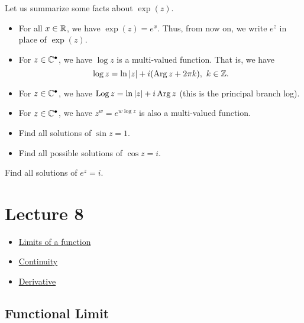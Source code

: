 \documentclass[a4paper]{report}
\begin{document}
Let us summarize some facts about \( \exp(z) \).

\begin{itemize}
    \item For all \( x \in \mathbb{R}  \), we have \( \exp(z) = e^{x} \). Thus, from now on, we write \( e^{z} \) in place of \( \exp(z) \).
    \item For \( z \in \mathbb{C}^{\bullet} \), we have \( \log z  \) is a multi-valued function. That is, we have 
        \[  \log z = \ln | z  |  + i (\operatorname{Arg} z + 2 \pi k ), \ k \in \mathbb{Z}.  \]
    \item For \( z \in \mathbb{C}^{\bullet} \), we have \( \operatorname{Log} z = \ln | z  |  + i \operatorname{Arg} z  \) (this is the principal branch log).
    \item For \( z \in \mathbb{C}^{\bullet} \), we have \( z^{w } = e^{w \log z} \) is also a multi-valued function.
\end{itemize}

\begin{eg}
    \begin{itemize}
        \item Find all solutions of \( \sin z = 1  \).
        \item Find all possible solutions of \( \cos z = i  \).
    \end{itemize}
\end{eg}

\begin{problem}
     Find all solutions of \( e^{z} = i  \).
\end{problem}
\begin{solution}

\end{solution}

\section{Lecture 8}

\begin{itemize}
    \item {\hyperref[Limits of a function]{Limits of a function}}  
    \item {\hyperref[Continuity]{Continuity}} 
    \item {\hyperref[Derivative]{Derivative}} 
\end{itemize}

\subsection{Functional Limit}\label{Limits of a function}
\end{document}
